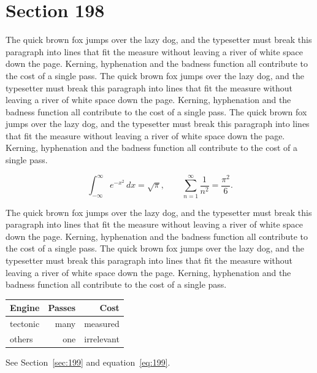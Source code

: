 \documentclass{article}
\begin{document}
\section{Section 198}
\label{sec:198}
The quick brown fox jumps over the lazy dog, and the typesetter must break this paragraph into lines that fit the measure without leaving a river of white space down the page. Kerning, hyphenation and the badness function all contribute to the cost of a single pass. The quick brown fox jumps over the lazy dog, and the typesetter must break this paragraph into lines that fit the measure without leaving a river of white space down the page. Kerning, hyphenation and the badness function all contribute to the cost of a single pass. The quick brown fox jumps over the lazy dog, and the typesetter must break this paragraph into lines that fit the measure without leaving a river of white space down the page. Kerning, hyphenation and the badness function all contribute to the cost of a single pass. 

\begin{equation}\label{eq:198}
\int_{-\infty}^{\infty} e^{-x^{2}}\,dx = \sqrt{\pi}, \qquad
\sum_{n=1}^{\infty} \frac{1}{n^{2}} = \frac{\pi^{2}}{6}.
\end{equation}

The quick brown fox jumps over the lazy dog, and the typesetter must break this paragraph into lines that fit the measure without leaving a river of white space down the page. Kerning, hyphenation and the badness function all contribute to the cost of a single pass. The quick brown fox jumps over the lazy dog, and the typesetter must break this paragraph into lines that fit the measure without leaving a river of white space down the page. Kerning, hyphenation and the badness function all contribute to the cost of a single pass. 

\begin{center}
\begin{tabular}{lrr}
\toprule
Engine & Passes & Cost \\
\midrule
tectonic & many & measured \\
others & one & irrelevant \\
\bottomrule
\end{tabular}
\end{center}

See Section~\ref{sec:199} and equation~\eqref{eq:199}.
\end{document}
